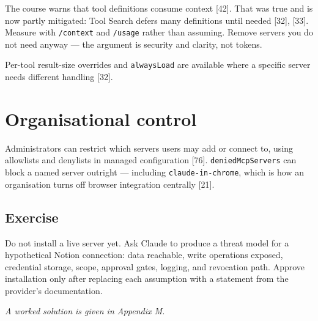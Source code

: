 \documentclass[11pt,a4paper,twoside,openany]{book}
\begin{document}
The course warns that tool definitions consume context [42]. That was true and is now partly mitigated: Tool Search defers many definitions until needed [32], [33]. Measure with \texttt{/\allowbreak{}context} and \texttt{/\allowbreak{}usage} rather than assuming. Remove servers you do not need anyway — the argument is security and clarity, not tokens.


Per-tool result-size overrides and \texttt{always\allowbreak{}Load} are available where a specific server needs different handling [32].


\FloatBarrier
\setcounter{section}{4}
\section{Organisational control}

Administrators can restrict which servers users may add or connect to, using allowlists and denylists in managed configuration [76]. \texttt{denied\allowbreak{}Mcp\allowbreak{}Servers} can block a named server outright — including \texttt{claude-\allowbreak{}in-\allowbreak{}chrome}, which is how an organisation turns off browser integration centrally [21].


\subsection*{Exercise}

Do not install a live server yet. Ask Claude to produce a threat model for a hypothetical Notion connection: data reachable, write operations exposed, credential storage, scope, approval gates, logging, and revocation path. Approve installation only after replacing each assumption with a statement from the provider's documentation.


\emph{A worked solution is given in Appendix M.}
\end{document}
